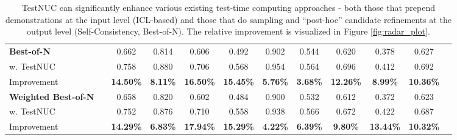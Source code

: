 \begin{table*}[!th]
{\begin{tabular}{@{}llcccccccccc@{}}
\textbf{Best-of-N} & & 0.662 & 0.814 & 0.606 & 0.492 & 0.902 & 0.544 & 0.620 & 0.378 & 0.627 \\
w. TestNUC & & 0.758 & 0.880 & 0.706 & 0.568 & 0.954 & 0.564 & 0.696 & 0.412 & 0.692 \\
Improvement & & {\color[HTML]{34a854}\textbf{ 14.50\%}} & {\color[HTML]{34a854}\textbf{ 8.11\%}} & {\color[HTML]{34a854}\textbf{ 16.50\%}} & {\color[HTML]{34a854}\textbf{ 15.45\%}} & {\color[HTML]{34a854}\textbf{ 5.76\%}} & {\color[HTML]{34a854}\textbf{ 3.68\%}} & {\color[HTML]{34a854}\textbf{ 12.26\%}} & {\color[HTML]{34a854}\textbf{ 8.99\%}} & {\color[HTML]{34a854}\textbf{ 10.36\%}} \\ \midrule \midrule
\textbf{Weighted Best-of-N} & & 0.658 & 0.820 & 0.602 & 0.484 & 0.900 & 0.532 & 0.612 & 0.372 & 0.623 \\
w. TestNUC & & 0.752 & 0.876 & 0.710 & 0.558 & 0.938 & 0.566 & 0.672 & 0.422 & 0.687 \\
Improvement & & {\color[HTML]{34a854}\textbf{ 14.29\%}} & {\color[HTML]{34a854}\textbf{ 6.83\%}} & {\color[HTML]{34a854}\textbf{ \textbf{17.94\%}}} & {\color[HTML]{34a854}\textbf{ 15.29\%}} & {\color[HTML]{34a854}\textbf{ 4.22\%}} & {\color[HTML]{34a854}\textbf{ 6.39\%}} & {\color[HTML]{34a854}\textbf{ 9.80\%}} & {\color[HTML]{34a854}\textbf{ 13.44\%}} & {\color[HTML]{34a854}\textbf{ 10.32\%}} \\
\bottomrule
\end{tabular}%
}
\caption{TestNUC can significantly enhance various existing test-time computing approaches - both those that prepend demonstrations at the input level (ICL-based) and those that do sampling and “post-hoc” candidate refinements at the output level (Self-Consistency, Best-of-N). The relative improvement is visualized in Figure \ref{fig:radar_plot}.}
\label{tab:main_enhance}
\end{table*}

